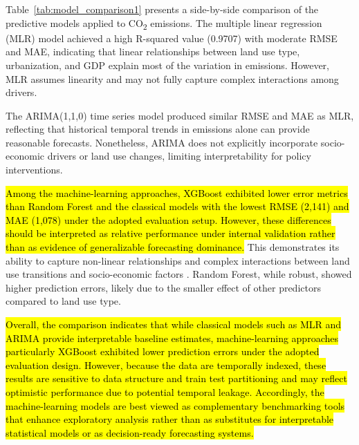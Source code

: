 \documentclass[10pt,letterpaper]{article}
\begin{document}
Table~\ref{tab:model_comparison1} presents a side-by-side comparison of the predictive models applied to CO\textsubscript{2} emissions. The multiple linear regression (MLR) model achieved a high R-squared value (0.9707) with moderate RMSE and MAE, indicating that linear relationships between land use type, urbanization, and GDP explain most of the variation in emissions. However, MLR assumes linearity and may not fully capture complex interactions among drivers.

The ARIMA(1,1,0) time series model produced similar RMSE and MAE as MLR, reflecting that historical temporal trends in emissions alone can provide reasonable forecasts. Nonetheless, ARIMA does not explicitly incorporate socio-economic drivers or land use changes, limiting interpretability for policy interventions.


\hl{Among the machine-learning approaches, XGBoost exhibited lower error metrics than Random Forest and the classical models with the lowest RMSE (2,141) and MAE (1,078) under the adopted evaluation setup. However, these differences should be interpreted as relative performance under internal validation rather than as evidence of generalizable forecasting dominance.}  This demonstrates its ability to capture non-linear relationships and complex interactions between land use transitions and socio-economic factors . Random Forest, while robust, showed higher prediction errors, likely due to the smaller effect of other predictors compared to land use type.

\hl{Overall, the comparison indicates that while classical models such as MLR and ARIMA provide interpretable baseline estimates, machine-learning approaches particularly XGBoost exhibited lower prediction errors under the adopted evaluation design. However, because the data are temporally indexed, these results are sensitive to data structure and train test partitioning and may reflect optimistic performance due to potential temporal leakage. Accordingly, the machine-learning models are best viewed as complementary benchmarking tools that enhance exploratory analysis rather than as substitutes for interpretable statistical models or as decision-ready forecasting systems.}

\end{document}
